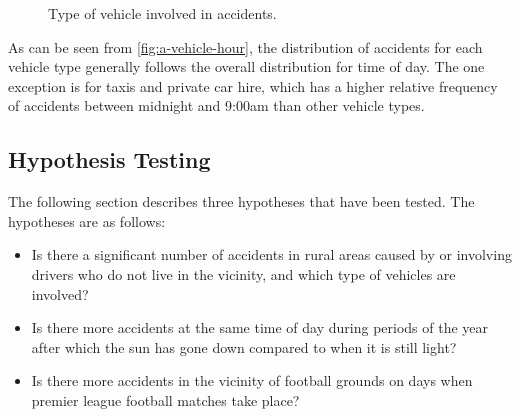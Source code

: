 \documentclass[12pt]{article}
\begin{document}
\begin{figure}[h]
\centering     %
{}
\caption{Type of vehicle involved in accidents.}
\label{vehicles-day-week}
\end{figure}

\newpage

As can be seen from \ref{fig:a-vehicle-hour}, the distribution of accidents for each vehicle type generally follows the overall distribution for time of day. The one exception is for taxis and private car hire, which has a higher relative frequency of accidents between midnight and 9:00am than other vehicle types.

\newpage

\subsection{Hypothesis Testing}

The following section describes three hypotheses that have been tested. The hypotheses are as follows:

\begin{itemize}
\item Is there a significant number of accidents in rural areas caused by or involving drivers who do not live in the vicinity, and which type of vehicles are involved?
\item Is there more accidents at the same time of day during periods of the year after which the sun has gone down compared to when it is still light?
\item Is there more accidents in the vicinity of football grounds on days when premier league football matches take place?
\end{itemize}
\end{document}
